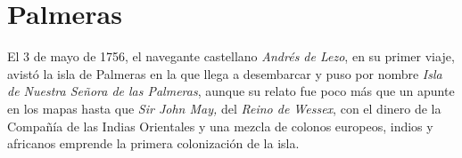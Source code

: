 
\section{Palmeras}

El 3 de mayo de 1756, el navegante castellano \emph{Andrés de Lezo}, en su primer viaje, avistó la isla de Palmeras en la que llega a desembarcar y puso por nombre \emph{Isla de Nuestra Señora de las Palmeras}, aunque su relato fue poco más que un apunte en los mapas hasta que \emph{Sir John May,} del \emph{Reino de Wessex}, con el dinero de la Compañía de las Indias Orientales y una mezcla de colonos europeos, indios y africanos emprende la primera colonización de la isla.